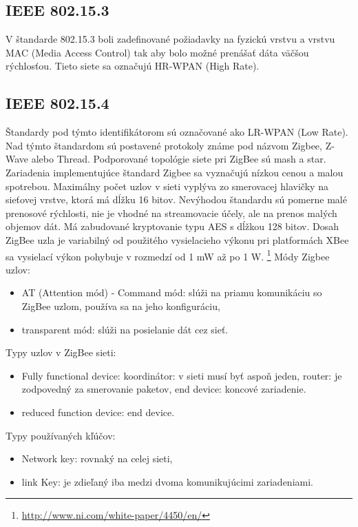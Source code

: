\documentclass[12pt,a4paper,oneside,openright]{report}
\begin{document}
\subsection{IEEE 802.15.3}
V štandarde 802.15.3 boli zadefinované požiadavky na fyzickú vrstvu a vrstvu MAC (Media Access Control) tak aby bolo možné prenášať dáta väčšou rýchlosťou. Tieto siete sa označujú HR-WPAN (High Rate).

\subsection{IEEE 802.15.4}
Štandardy pod týmto identifikátorom sú označované ako LR-WPAN (Low Rate). Nad týmto štandardom sú postavené protokoly známe pod názvom Zigbee, Z-Wave alebo Thread.
Podporované topológie siete pri ZigBee sú mash a star. Zariadenia implementujúce štandard Zigbee sa vyznačujú nízkou cenou a malou spotrebou. Maximálny počet uzlov v sieti vyplýva zo smerovacej hlavičky na sieťovej vrstve, ktorá má dĺžku 16 bitov. Nevýhodou štandardu sú pomerne malé prenosové rýchlosti, nie je vhodné na streamovacie účely, ale na prenos malých objemov dát. Má zabudované kryptovanie typu AES s dĺžkou 128 bitov. Dosah ZigBee uzla je variabilný od použitého vysielacieho výkonu pri platformách XBee sa vysielací výkon pohybuje v rozmedzí od 1 mW až po 1 W.
\footnote{\url{http://www.ni.com/white-paper/4450/en/}}
Módy Zigbee uzlov:
\begin{itemize}
	\item AT (Attention mód) - Command mód: slúži na priamu komunikáciu so ZigBee uzlom, používa sa na jeho konfiguráciu,
	\item transparent mód: slúži na posielanie dát cez sieť.
\end{itemize}
\onehalfspacing

Typy uzlov v ZigBee sieti:
\singlespacing
\begin{itemize}
	\item Fully functional device:
		\subitem koordinátor: v sieti musí byť aspoň jeden,
		\subitem router: je zodpovedný za smerovanie paketov,
		\subitem end device: koncové zariadenie.
	\item reduced function device:
		\subitem end device.
\end{itemize}
\onehalfspacing

Typy používaných kľúčov:
\singlespacing
\begin{itemize}
	\item Network key: rovnaký na celej sieti,
	\item link Key: je zdieľaný iba medzi dvoma komunikujúcimi zariadeniami.
\end{itemize}
\onehalfspacing
\end{document}
